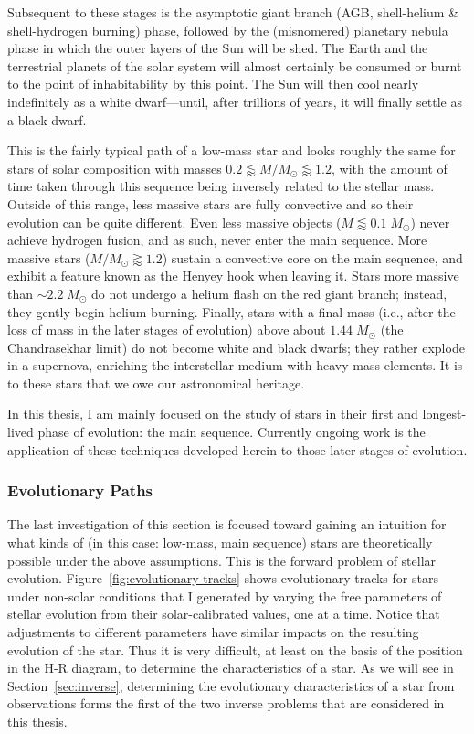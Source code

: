 Subsequent to these stages is the asymptotic giant branch (AGB, shell-helium \& shell-hydrogen burning) phase, followed by the (misnomered) planetary nebula phase in which the outer layers of the Sun will be shed. 
The Earth and the terrestrial planets of the solar system will almost certainly be consumed or burnt to the point of inhabitability by this point. 
The Sun will then cool nearly indefinitely as a white dwarf---until, after trillions of years, it will finally settle as a black dwarf. 

This is the fairly typical path of a low-mass star and looks roughly the same for stars of solar composition with masses ${0.2 \lessapprox M/M_\odot \lessapprox 1.2}$, with the amount of time taken through this sequence being inversely related to the stellar mass. 
Outside of this range, less massive stars are fully convective and so their evolution can be quite different. 
Even less massive objects (${M \lessapprox 0.1\; M_\odot}$) never achieve hydrogen fusion, and as such, never enter the main sequence. 
More massive stars (${M/M_\odot \gtrapprox 1.2}$) sustain a convective core on the main sequence, and exhibit a feature known as the Henyey hook when leaving it. 
Stars more massive than ${\sim 2.2\;M_{\odot}}$ do not undergo a helium flash on the red giant branch; instead, they gently begin helium burning. 
Finally, stars with a final mass (i.e., after the loss of mass in the later stages of evolution) above about ${1.44\;M_\odot}$ (the Chandrasekhar limit) do not become white and black dwarfs; they rather explode in a supernova, enriching the interstellar medium with heavy mass elements. 
It is to these stars that we owe our astronomical heritage. 

In this thesis, I am mainly focused on the study of stars in their first and longest-lived phase of evolution: the main sequence. 
Currently ongoing work is the application of these techniques developed herein to those later stages of evolution. 



\subsubsection*{Evolutionary Paths}
The last investigation of this section is focused toward gaining an intuition for what kinds of (in this case: low-mass, main sequence) stars are theoretically possible under the above assumptions. 
This is the forward problem of stellar evolution. 
Figure~\ref{fig:evolutionary-tracks} shows evolutionary tracks for stars under non-solar conditions that I generated by varying the free parameters of stellar evolution from their solar-calibrated values, one at a time. 
Notice that adjustments to different parameters have similar impacts on the resulting evolution of the star. 
Thus it is very difficult, at least on the basis of the position in the H-R diagram, to determine the characteristics of a star. 
As we will see in Section~\ref{sec:inverse}, determining the evolutionary characteristics of a star from observations forms the first of the two inverse problems that are considered in this thesis. 

